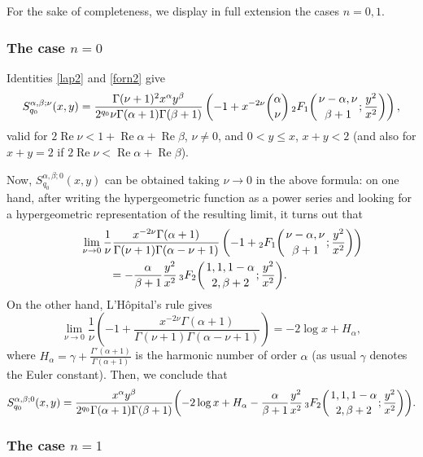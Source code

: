 \documentclass[10pt,leqno,a4paper]{article}
\theoremstyle{plain}
\renewcommand{\Re}{\operatorname{Re}}
\numberwithin{equation}{section}
\newcommand{\FF}[3]{{}_{2}F_{1}%
  \mathopen{}\left(\genfrac{}{}{0pt}{}{#1}{#2};#3\right)\mathclose{}}
\newcommand{\tresFFdos}[3]{{}_{3}F_{2}%
  \mathopen{}\left(\genfrac{}{}{0pt}{}{#1}{#2};#3\right)\mathclose{}}
\begin{document}
For the sake of completeness, we display in full extension the cases $n=0,1$.

\subsubsection{The case $n=0$}
\label{cason=0}

Identities \eqref{lap2} and \eqref{forn2} give
\begin{equation}
\label{usup}
   S_{q_0}^{\alpha,\beta;\nu}(x,y)
   = \frac{\Gamma(\nu+1)^2 x^\alpha y^\beta}{2^{q_0}\nu \Gamma(\alpha+1)\Gamma(\beta+1)}
   \left(
   -1 +  x^{-2\nu} \binom{\alpha}{\nu} \, \FF{\nu-\alpha,\nu}{\beta+1}{\frac{y^2}{x^2}}
   \right),
\end{equation}
valid for $2\Re\nu < 1 + \Re\alpha + \Re\beta$, $\nu\neq 0$, and $0 < y \leq x$, $x+y < 2$ (and also for $x+y=2$ if $2\Re \nu <\Re \alpha+\Re \beta$).

Now, $S_{q_0}^{\alpha,\beta;0}(x,y)$ can be obtained taking $\nu \to 0$ in the above formula: on one hand, after writing the hypergeometric function as a power series and looking for a hypergeometric representation of the resulting limit, it turns out that
\begin{multline*}
\qquad
   \lim_{\nu \to 0}
   \frac{1}{\nu}
   \frac{x^{-2\nu} \Gamma(\alpha+1)}{\Gamma(\nu+1) \Gamma(\alpha-\nu+1)}
   \left(-1 + \FF{\nu-\alpha,\nu}{\beta+1}{\frac{y^2}{x^2}}
   \right)
   \\
   = - \frac{\alpha}{\beta+1} \frac{y^2}{x^2}
   \,\tresFFdos{1,1,1-\alpha}{2,\beta+2}{\frac{y^2}{x^2}}.
\qquad
\end{multline*}
On the other hand, L'H\^opital's rule gives
\[
   \lim_{\nu\to 0}
   \frac{1}{\nu} \left(
   -1 + \frac{x^{-2\nu} \Gamma(\alpha+1)}{\Gamma(\nu+1) \Gamma(\alpha-\nu+1)}
   \right)
   = - 2 \log x + H_\alpha,
\]
where $H_\alpha = \gamma + \frac{\Gamma'(\alpha+1)}{\Gamma(\alpha+1)}$ is the harmonic number of order $\alpha$ (as usual $\gamma$ denotes the Euler constant).
Then, we conclude that
\begin{equation*}
   S_{q_0}^{\alpha,\beta;0}(x,y)
   \\
   = \frac{x^\alpha y^\beta}{2^{q_0}\Gamma(\alpha+1)\Gamma(\beta+1)}
   \biggl(
  -2 \log x + H_\alpha - \frac{\alpha}{\beta+1} \frac{y^2}{x^2}
  \,\tresFFdos{1,1,1-\alpha}{2,\beta+2}{\frac{y^2}{x^2}}
   \biggr).
\end{equation*}

\subsubsection{The case $n=1$}
\label{cason=1}
\end{document}
